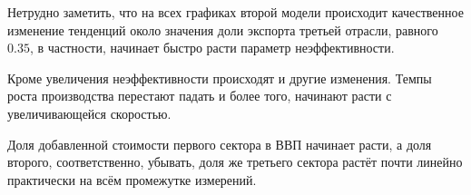 \documentclass[10pt, a4paper]{article}
\begin{document}
\begin{figure}[H]
\centering
{}
\end{figure}

Нетрудно заметить, что на всех графиках второй модели происходит качественное изменение тенденций около значения доли экспорта третьей отрасли, равного $0.35$, в частности, начинает быстро расти параметр неэффективности.

Кроме увеличения неэффективности происходят и другие изменения. Темпы роста производства перестают падать и более того, начинают расти с увеличивающейся скоростью. 

Доля добавленной стоимости первого сектора в ВВП начинает расти, а доля второго, соответственно, убывать, доля же третьего сектора растёт почти линейно практически на всём промежутке измерений.
\end{document}
